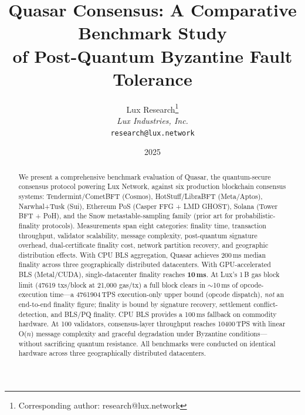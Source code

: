 \documentclass[11pt]{article}
\title{Quasar Consensus: A Comparative Benchmark Study\\of Post-Quantum Byzantine Fault Tolerance}
\author{
Lux Research\thanks{Corresponding author: research@lux.network}\\
\textit{Lux Industries, Inc.}\\
\texttt{research@lux.network}
}
\date{2025}
\begin{document}
\luxcoverpage

\begin{abstract}
We present a comprehensive benchmark evaluation of Quasar, the quantum-secure consensus
protocol powering Lux Network, against six production blockchain consensus systems:
Tendermint/CometBFT (Cosmos), HotStuff/LibraBFT (Meta/Aptos), Narwhal+Tusk (Sui),
Ethereum PoS (Casper FFG + LMD GHOST), Solana (Tower BFT + PoH), and the Snow
metastable-sampling family (prior art for probabilistic-finality protocols). Measurements span eight categories: finality time, transaction
throughput, validator scalability, message complexity, post-quantum signature overhead,
dual-certificate finality cost, network partition recovery, and geographic distribution
effects. With CPU BLS aggregation, Quasar achieves 200\,ms median finality across
three geographically distributed datacenters. With GPU-accelerated BLS (Metal/CUDA),
single-datacenter finality reaches \textbf{10\,ms}. At Lux's 1\,B gas block limit
(\num{47619} txs/block at 21{,}000 gas/tx) a full block clears in $\sim$10\,ms of
opcode-execution time---a \num{4761904}\,TPS execution-only upper bound (opcode dispatch),
\emph{not} an end-to-end finality figure; finality is bound by signature recovery,
settlement conflict-detection, and BLS/PQ finality.
CPU BLS provides a 100\,ms fallback on commodity hardware.
At 100 validators, consensus-layer throughput reaches \num{10400}\,TPS with linear
O($n$) message complexity and graceful degradation under Byzantine conditions---without
sacrificing quantum resistance. All benchmarks were conducted on identical hardware
across three geographically distributed datacenters.
\end{abstract}

\tableofcontents
\newpage





















\end{document}
